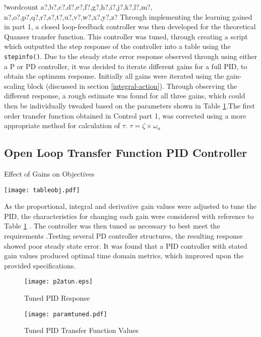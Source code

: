\documentclass[11pt]{article}
\newcounter{words}
\newenvironment{counted}{%
  \setcounter{words}{0}
  \SearchList!{wordcount}{\stepcounter{words}}
    {a?,b?,c?,d?,e?,f?,g?,h?,i?,j?,k?,l?,m?,
    n?,o?,p?,q?,r?,s?,t?,u?,v?,w?,x?,y?,z?}
  \UndoBoundary{'}
  \SearchOrder{p;}}{%
  \StopSearching}
\begin{document}
\begin{counted}
Through implementing the learning gained in part 1, a closed
loop-feedback controller was then developed for the theoretical Quanser
transfer function. This controller was tuned, through creating a script
which outputted the step response of the controller into a table using
the \texttt{stepinfo()}. Due to the steady state error response observed
through using either a P or PD controller, it was decided to iterate
different gains for a full PID, to obtain the optimum response.
Initially all gains were iterated using the gain-scaling block
(discussed in section \ref{integral-action}). Through observing the
different response, a rough estimate was found for all three gains,
which could then be individually tweaked based on the parameters shown
in Table \ref{paramtab}.The first order transfer function obtained in
Control part 1, was corrected using a more appropriate method for
calculation of \(\tau\). \(\tau = \zeta \times \omega_n\)

\subsection{Open Loop Transfer Function PID
Controller}\label{open-loop-transfer-function-pid-controller}

\begin{wraptable}{l}{0.5\textwidth}
\vspace{-10pt}
\caption{Effect of Gains on Objectives}
\vspace{-5pt}
\centering
 \texttt{[image: tableobj.pdf]}
 \vspace{-15pt}
 \label{paramtab}
\end{wraptable}

As the proportional, integral and derivative gain values were adjusted
to tune the PID, the characteristics for changing each gain were
considered with reference to Table \ref{paramtab} . The controller was
then tuned as necessary to best meet the requirements .Testing several
PD controller structures, the resulting response showed poor steady
state error. It was found that a PID controller with stated gain values
produced optimal time domain metrics, which improved upon the provided
specifications.

\begin{figure}[H]
\centering
\begin{minipage}{.55\textwidth}
 \centering
 \texttt{[image: p2atun.eps]}
 \vspace{-20pt}
 \caption{Tuned PID Response}
 \label{p2bres}
\end{minipage}
\hfill
\begin{minipage}{.35\textwidth}
\centering
\texttt{[image: paramtuned.pdf]}
\vspace{-10pt}
\caption{Tuned PID Transfer Function Values}
\label{paramtab}
\end{minipage}
\vspace{-20pt}
\end{figure}


\end{counted}
\end{document}
